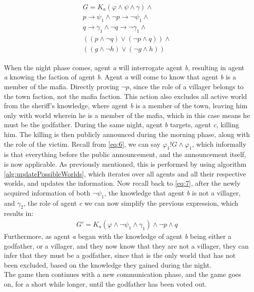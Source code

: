 \begin{align}
	\begin{split}
		G = K_a(\varphi \land \psi \land\gamma)\land                        \\
		p \rightarrow \psi_1 \land \neg p \rightarrow \neg \psi_1 \land     \\
		q \rightarrow \gamma_1 \land \neg q \rightarrow \neg \gamma_1 \land \\
		((p \land \neg q) \lor (\neg p \land q)) \land                      \\
		((g \land \neg h) \lor (\neg g \land h))
		\label{eq:7}
	\end{split}
\end{align}

When the night phase comes, agent \textit{a} will interrogate agent \textit{b},
resulting in agent \textit{a} knowing the faction of agent \textit{b}. Agent
\textit{a} will come to know that agent \textit{b} is a member of the mafia.
Directly proving $\neg p$, since the role of a villager belongs to the town
faction, not the mafia faction. This action also excludes all active world from
the sheriff's knowledge, where agent \textit{b} is a member of the town,
leaving him only with world wherein he is a member of the mafia, which in this
case means he must be the godfather. During the same night, agent \textit{b}
targets, agent \textit{c}, killing him. The killing is then publicly announced
during the morning phase, along with the role of the victim. Recall from
\cref{eq:6}, we can say $\varphi_1!G\land\varphi_1$, which informally is that
everything before the public announcement, and the announcement itself, is now
applicable. As previously mentioned, this is performed by using algorithm
\ref{alg:updatePossibleWorlds}, which iterates over all agents and all
their respective worlds, and updates the information. Now recall back to
\cref{eq:7}, after the newly acquired information of both $\neg \psi_1$, the
knowledge that agent \textit{b} is not a villager, and $\gamma_2$, the role of
agent \textit{c} we can now simplify the previous expression, which results in:
\begin{align}
	G' = K_a(\varphi \land \neg \psi_1 \land \gamma_1) \land \neg p \land q
\end{align}
Furthermore, as agent \textit{a} began with the knowledge of agent \textit{b}
being either a godfather, or a villager, and they now know that they are not a
villager, they can infer that they must be a godfather, since that is the only
world that has not been excluded, based on the knowledge they gained during the
night. \\
The game then continues with a new communication phase, and the game goes on,
for a short while longer, until the godfather has been voted out.
